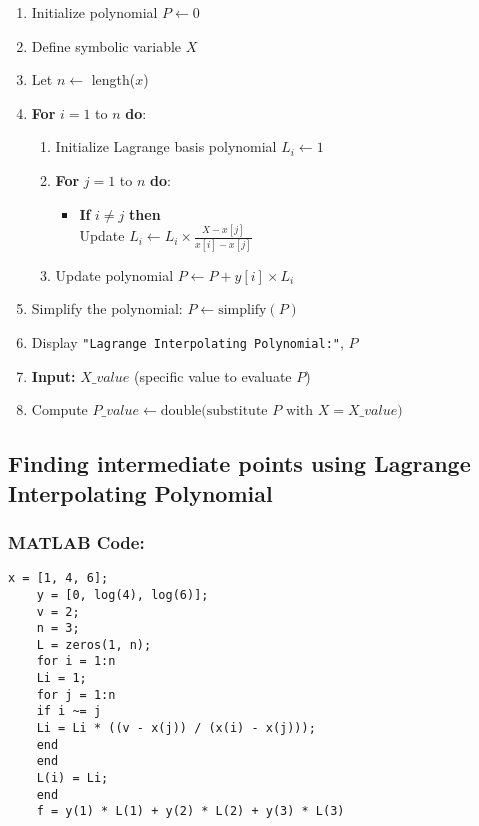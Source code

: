 \documentclass[a4paper,12pt]{article}
\begin{document}
	\begin{enumerate}
		\item Initialize polynomial $P \leftarrow 0$
		\item Define symbolic variable $X$
		\item Let $n \leftarrow$ length($x$)
		\item \textbf{For} $i = 1$ to $n$ \textbf{do}:
		\begin{enumerate}
			\item Initialize Lagrange basis polynomial $L_i \leftarrow 1$
			\item \textbf{For} $j = 1$ to $n$ \textbf{do}:
			\begin{itemize}
				\item \textbf{If} $i \ne j$ \textbf{then} \\
				Update $L_i \leftarrow L_i \times \frac{X - x[j]}{x[i] - x[j]}$
			\end{itemize}
			\item Update polynomial $P \leftarrow P + y[i] \times L_i$
		\end{enumerate}
		\item Simplify the polynomial: $P \leftarrow \text{simplify}(P)$
		\item Display \texttt{"Lagrange Interpolating Polynomial:"}, $P$
		\item \textbf{Input:} $X\_value$ (specific value to evaluate $P$)
		\item Compute $P\_value \leftarrow \text{double(substitute } P \text{ with } X = X\_value)$
	\end{enumerate}
	
	\newpage
	\subsection{Finding intermediate points using Lagrange Interpolating Polynomial}
	
	\subsubsection{MATLAB Code:}
	\begin{lstlisting}[style=vscode-light, caption={Lagrange Interpolating Polynomial in MATLAB.} ]
	x = [1, 4, 6];
	y = [0, log(4), log(6)];
	v = 2;
	n = 3;       
	L = zeros(1, n);     
	for i = 1:n
	Li = 1;         
	for j = 1:n
	if i ~= j
	Li = Li * ((v - x(j)) / (x(i) - x(j)));
	end
	end
	L(i) = Li;       
	end
	f = y(1) * L(1) + y(2) * L(2) + y(3) * L(3)  
	
	
	
	
	
	

	\end{lstlisting}
	
\end{document}
